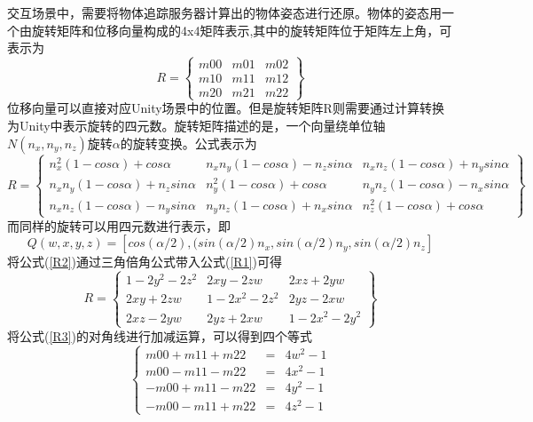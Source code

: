 交互场景中，需要将物体追踪服务器计算出的物体姿态进行还原。物体的姿态用一个由旋转矩阵和位移向量构成的4x4矩阵表示,其中的旋转矩阵位于矩阵左上角，可表示为
\begin{equation} 
R = 
 \begin{Bmatrix}
   m00 & m01 & m02 \\
   m10 & m11 & m12 \\
   m20 & m21 & m22  
  \end{Bmatrix}
\end{equation} 
  位移向量可以直接对应Unity场景中的位置。但是旋转矩阵R则需要通过计算转换为Unity中表示旋转的四元数。旋转矩阵描述的是，一个向量绕单位轴$N(n_x, n_y, n_z)$旋转$\alpha$的旋转变换。公式表示为
  \begin{equation}\label{R1}
 R = 
  \begin{Bmatrix}
   n_x^2(1-cos\alpha)+cos\alpha & n_x n_y(1-cos\alpha) - n_zsin\alpha & n_x n_z(1-cos\alpha) + n_ysin\alpha \\
   n_x n_y(1-cos\alpha) + n_zsin\alpha & n_y^2(1-cos\alpha) + cos\alpha & n_y n_z(1-cos\alpha) - n_xsin\alpha \\
   n_x n_z(1-cos\alpha) - n_ysin\alpha & n_y n_z(1-cos\alpha) + n_xsin\alpha & n_z^2(1-cos\alpha) + cos\alpha 
  \end{Bmatrix}
\end{equation}
而同样的旋转可以用四元数进行表示，即
  \begin{equation}\label{R2}
Q(w, x, y, z) = [cos(\alpha/2), (sin(\alpha/2)n_x, sin(\alpha/2)n_y, sin(\alpha/2)n_z]
\end{equation}
将公式(\ref{R2})通过三角倍角公式带入公式(\ref{R1})可得
  \begin{equation}\label{R3}
 R = 
  \begin{Bmatrix}
   1-2y^2-2z^2 & 2xy-2zw & 2xz+2yw \\
   2xy+2zw & 1-2x^2-2z^2 & 2yz - 2xw \\
   2xz - 2yw & 2yz + 2xw & 1-2x^2-2y^2
  \end{Bmatrix}
\end{equation}
将公式(\ref{R3})的对角线进行加减运算，可以得到四个等式
\begin{equation}\label{R4}
\left\{
\begin{aligned}
m00 + m11 + m22 &=& 4w^2 - 1 \\
m00 - m11 - m22 &=& 4x^2 - 1 \\
-m00 + m11 - m22 &=& 4y^2 - 1 \\
-m00 - m11 + m22 &=& 4z^2 - 1 
\end{aligned}
\right.
\end{equation}
